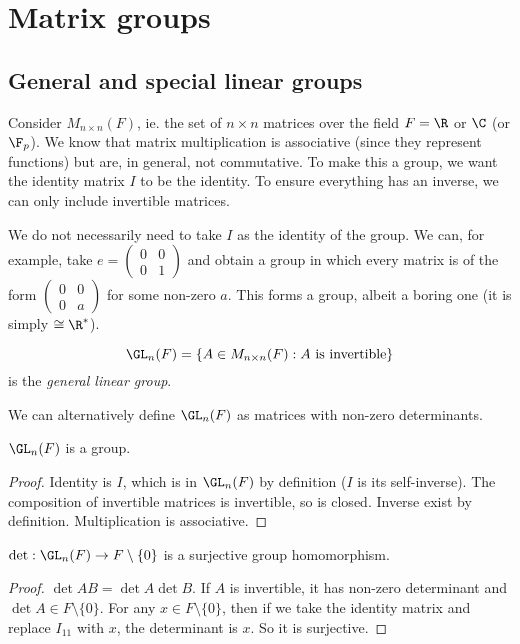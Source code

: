 \documentclass[a4paper]{article}
\begin{document}
\section{Matrix groups}
\subsection{General and special linear groups}
Consider $M_{n\times n}(F)$, ie. the set of $n\times n$ matrices over the field $F = \R$ or $\C$ (or $\F_p$). We know that matrix multiplication is associative (since they represent functions) but are, in general, not commutative. To make this a group, we want the identity matrix $I$ to be the identity. To ensure everything has an inverse, we can only include invertible matrices.

\note We do not necessarily need to take $I$ as the identity of the group. We can, for example, take $e =
\begin{pmatrix}
  0 & 0\\
  0 & 1
\end{pmatrix}$ and obtain a group in which every matrix is of the form $\begin{pmatrix}
  0 & 0\\
  0 & a
\end{pmatrix}$ for some non-zero $a$. This forms a group, albeit a boring one (it is simply $\cong \R^*$).
\begin{defi}
  \[
    \GL_n(F) = \{A\in M_{n\times n}(F) : A\text{ is invertible}\}
  \]
  is the \emph{general linear group}.
\end{defi}
\note We can alternatively define $\GL_n(F)$ as matrices with non-zero determinants.

\begin{prop}
  $\GL_n(F)$ is a group.
\end{prop}
\begin{proof}
  Identity is $I$, which is in $\GL_n(F)$ by definition ($I$ is its self-inverse). The composition of invertible matrices is invertible, so is closed. Inverse exist by definition. Multiplication is associative.
\end{proof}

\begin{prop}
  $\det: \GL_n(F) \to F\setminus\{0\}$ is a surjective group homomorphism.
\end{prop}

\begin{proof}
  $\det AB = \det A\det B$. If $A$ is invertible, it has non-zero determinant and $\det A\in F\setminus\{0\}$. For any $x\in F\setminus\{0\}$, then if we take the identity matrix and replace $I_{11}$ with $x$, the determinant is $x$. So it is surjective.
\end{proof}
\end{document}
